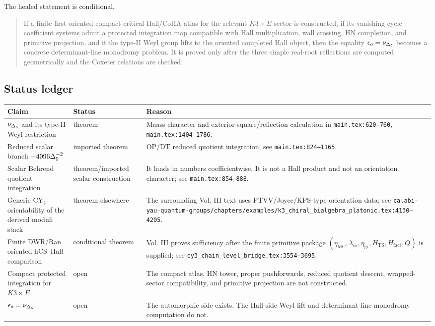 The healed statement is conditional.

\begin{quote}
If a finite-first oriented compact critical Hall/CoHA atlas for the
relevant \(K3\times E\) sector is constructed, if its vanishing-cycle
coefficient systems admit a protected integration map compatible with
Hall multiplication, wall crossing, HN completion, and primitive
projection, and if the type-II Weyl group lifts to the oriented
completed Hall object, then the equality
\(\epsilon_o=\nu_{\Delta_5}\) becomes a concrete determinant-line monodromy
problem.  It is proved only after the three simple real-root reflections
are computed geometrically and the Coxeter relations are checked.
\end{quote}

\subsection{Status ledger}

\begin{center}
\small
\begin{tabular}{p{}p{}p{}}
\hline
Claim & Status & Reason \\
\hline
\(\nu_{\Delta_5}\) and its type-II Weyl restriction &
theorem &
Maass character and exterior-square/reflection calculation in
\texttt{main.tex:620--760}, \texttt{main.tex:1404--1786}. \\
Reduced scalar branch
\(-4096\Delta_5^{-2}\) &
imported theorem &
OP/DT reduced quotient integration; see
\texttt{main.tex:824--1165}. \\
Scalar Behrend quotient integration &
theorem/imported scalar construction &
It lands in numbers coefficientwise.  It is not a Hall product and not
an orientation character; see \texttt{main.tex:854--888}. \\
Generic CY\(_3\) orientability of the derived moduli stack &
theorem elsewhere &
The surrounding Vol. III text uses PTVV/Joyce/KPS-type orientation data;
see
\texttt{calabi-yau-quantum-groups/chapters/examples/k3\_chiral\_bialgebra\_platonic.tex:4130--4205}. \\
Finite DWR/Ran oriented hCS--Hall comparison &
conditional theorem &
Vol. III proves sufficiency after the finite primitive package
\((\eta_{\mathrm{MC}},\lambda_{\mathrm{or}},\eta_{\mathrm{gr}},
H_{\mathrm{TS}},H_{\mathrm{fact}},Q)\) is supplied; see
\texttt{cy3\_chain\_level\_bridge.tex:3554--3695}. \\
Compact protected integration for \(K3\times E\) &
open &
The compact atlas, HN tower, proper pushforwards, reduced quotient
descent, wrapped-sector compatibility, and primitive projection are not
constructed. \\
\(\epsilon_o=\nu_{\Delta_5}\) &
open &
The automorphic side exists.  The Hall-side Weyl lift and
determinant-line monodromy computation do not. \\
\hline
\end{tabular}
\end{center}

